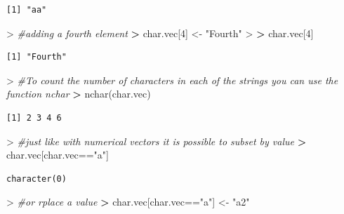 \documentclass[
]{book}
\newenvironment{Shaded}{\begin{snugshade}}{\end{snugshade}}
\newcommand{\CommentTok}[1]{\textcolor[rgb]{0.56,0.35,0.01}{\textit{#1}}}
\newcommand{\DecValTok}[1]{\textcolor[rgb]{0.00,0.00,0.81}{#1}}
\newcommand{\ErrorTok}[1]{\textcolor[rgb]{0.64,0.00,0.00}{\textbf{#1}}}
\newcommand{\FunctionTok}[1]{\textcolor[rgb]{0.00,0.00,0.00}{#1}}
\newcommand{\NormalTok}[1]{#1}
\newcommand{\OtherTok}[1]{\textcolor[rgb]{0.56,0.35,0.01}{#1}}
\newcommand{\SpecialCharTok}[1]{\textcolor[rgb]{0.00,0.00,0.00}{#1}}
\newcommand{\StringTok}[1]{\textcolor[rgb]{0.31,0.60,0.02}{#1}}
\theoremstyle{definition}
\theoremstyle{definition}
\theoremstyle{definition}
\theoremstyle{definition}
\theoremstyle{remark}
\begin{document}
\begin{verbatim}
[1] "aa"
\end{verbatim}

\begin{Shaded}
\begin{Highlighting}[]
\SpecialCharTok{\textgreater{}} \CommentTok{\#adding a fourth element}
\ErrorTok{\textgreater{}}\NormalTok{ char.vec[}\DecValTok{4}\NormalTok{] }\OtherTok{\textless{}{-}} \StringTok{"Fourth"}
\SpecialCharTok{\textgreater{}} 
\ErrorTok{\textgreater{}}\NormalTok{ char.vec[}\DecValTok{4}\NormalTok{]}
\end{Highlighting}
\end{Shaded}

\begin{verbatim}
[1] "Fourth"
\end{verbatim}

\begin{Shaded}
\begin{Highlighting}[]
\SpecialCharTok{\textgreater{}} \CommentTok{\#To count the number of characters in each of the strings you can use the function nchar}
\ErrorTok{\textgreater{}} \FunctionTok{nchar}\NormalTok{(char.vec)}
\end{Highlighting}
\end{Shaded}

\begin{verbatim}
[1] 2 3 4 6
\end{verbatim}

\begin{Shaded}
\begin{Highlighting}[]
\SpecialCharTok{\textgreater{}} \CommentTok{\#just like with numerical vectors it is possible to subset by value}
\ErrorTok{\textgreater{}}\NormalTok{ char.vec[char.vec}\SpecialCharTok{==}\StringTok{"a"}\NormalTok{]}
\end{Highlighting}
\end{Shaded}

\begin{verbatim}
character(0)
\end{verbatim}

\begin{Shaded}
\begin{Highlighting}[]
\SpecialCharTok{\textgreater{}} \CommentTok{\#or rplace a value}
\ErrorTok{\textgreater{}}\NormalTok{ char.vec[char.vec}\SpecialCharTok{==}\StringTok{"a"}\NormalTok{] }\OtherTok{\textless{}{-}} \StringTok{"a2"}
\end{Highlighting}
\end{Shaded}
\end{document}
